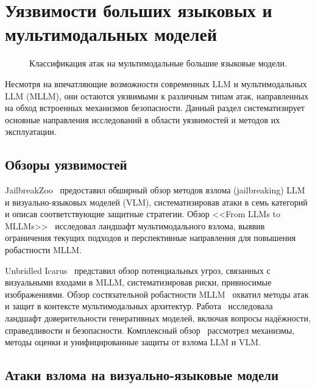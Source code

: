 \section{Уязвимости больших языковых и мультимодальных моделей}\label{sec:vulnerabilities}

\begin{figure}[htbp]
    \centering
    \resizebox{0.9\textwidth}{!}{
        
    }
    \caption{Классификация атак на мультимодальные большие языковые модели.}
    \label{fig:attack_taxonomy}
\end{figure}

Несмотря на впечатляющие возможности современных LLM и мультимодальных LLM (MLLM), они остаются уязвимыми к различным типам атак, направленных на обход встроенных механизмов безопасности. Данный раздел систематизирует основные направления исследований в области уязвимостей и методов их эксплуатации.

\subsection{Обзоры уязвимостей}\label{subsec:vulnerability_surveys}

JailbreakZoo~\cite{2407.01599} предоставил обширный обзор методов взлома (jailbreaking) LLM и визуально-языковых моделей (VLM), систематизировав атаки в семь категорий и описав соответствующие защитные стратегии. Обзор <<From LLMs to MLLMs>>~\cite{2406.14859} исследовал ландшафт мультимодального взлома, выявив ограничения текущих подходов и перспективные направления для повышения робастности MLLM.

Unbridled Icarus~\cite{2404.05264} представил обзор потенциальных угроз, связанных с визуальными входами в MLLM, систематизировав риски, привносимые изображениями. Обзор состязательной робастности MLLM~\cite{2503.13962} охватил методы атак и защит в контексте мультимодальных архитектур. Работа~\cite{2307.16680} исследовала ландшафт доверительности генеративных моделей, включая вопросы надёжности, справедливости и безопасности. Комплексный обзор~\cite{2601.03594} рассмотрел механизмы, методы оценки и унифицированные защиты от взлома LLM и VLM.

\subsection{Атаки взлома на визуально-языковые модели}\label{subsec:jailbreak_attacks}

